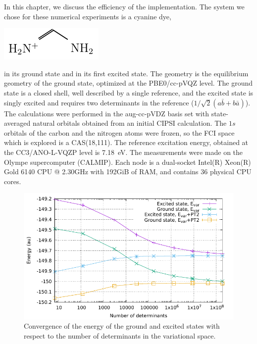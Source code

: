 \documentclass[./thesis.tex]{subfiles}
\begin{document}
In this chapter, we discuss the efficiency of the implementation. The system
we chose for these numerical experiments is a cyanine dye, \\
\begin{center}
\includegraphics[]{figures/perf/Cyanine} \\
\end{center}
in its ground state and in its first excited state.
The geometry is the equilibrium geometry of the ground state, optimized at the
PBE0/cc-pVQZ level. The ground state is a closed shell, well described by a
single reference, and the excited state is singly excited and requires two
determinants in the reference ($1/\sqrt{2} (a\bar{b} + b\bar{a})$).  The
calculations were performed in the aug-cc-pVDZ basis set with state-averaged
natural orbitals obtained from an initial CIPSI calculation.
The $1s$ orbitals of the carbon and the nitrogen atoms were frozen, so
the FCI space which is explored is a CAS(18,111). The reference excitation
energy, obtained at the CC3/ANO-L-VQZP level is 7.18~eV.\cite{Send_2011}
The measurements were made on the Olympe supercomputer (CALMIP). Each node is 
a dual-socket Intel(R) Xeon(R) Gold 6140 CPU @ 2.30GHz with 192GiB of RAM, and
contains 36 physical CPU cores.

\begin{figure}[hbt]
	\begin{center}
		\includegraphics[width=0.8\columnwidth]{figures/perf/cn3_energy}
		\caption{Convergence of the energy of the ground and excited states with respect to the number of determinants in the variational space.}
		\label{fig:energy_pt2}
	\end{center}
\end{figure}
\end{document}
